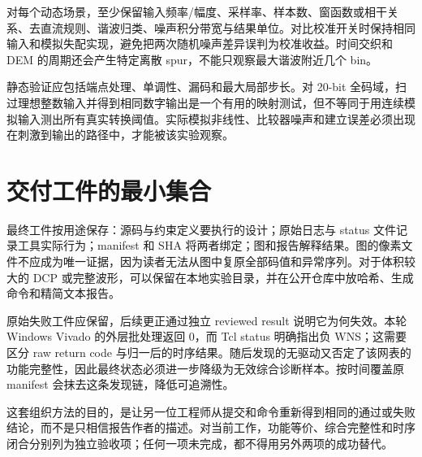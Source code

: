 对每个动态场景，至少保留输入频率/幅度、采样率、样本数、窗函数或相干关系、去直流规则、谐波归类、噪声积分带宽与结果单位。对比校准开关时保持相同输入和模拟失配实现，避免把两次随机噪声差异误判为校准收益。时间交织和 DEM 的周期还会产生特定离散 spur，不能只观察最大谐波附近几个 bin。

静态验证应包括端点处理、单调性、漏码和最大局部步长。对 20-bit 全码域，扫过理想整数输入并得到相同数字输出是一个有用的映射测试，但不等同于用连续模拟输入测出所有真实转换阈值。实际模拟非线性、比较器噪声和建立误差必须出现在刺激到输出的路径中，才能被该实验观察。

\section{交付工件的最小集合}
最终工件按用途保存：源码与约束定义要执行的设计；原始日志与 status 文件记录工具实际行为；manifest 和 SHA 将两者绑定；图和报告解释结果。图的像素文件不应成为唯一证据，因为读者无法从图中复原全部码值和异常序列。对于体积较大的 DCP 或完整波形，可以保留在本地实验目录，并在公开仓库中放哈希、生成命令和精简文本报告。

原始失败工件应保留，后续更正通过独立 reviewed result 说明它为何失效。本轮 Windows Vivado 的外层批处理返回 0，而 Tcl status 明确指出负 WNS；这需要区分 raw return code 与归一后的时序结果。随后发现的无驱动又否定了该网表的功能完整性，因此最终状态必须进一步降级为无效综合诊断样本。按时间覆盖原 manifest 会抹去这条发现链，降低可追溯性。

这套组织方法的目的，是让另一位工程师从提交和命令重新得到相同的通过或失败结论，而不是只相信报告作者的描述。对当前工作，功能等价、综合完整性和时序闭合分别列为独立验收项；任何一项未完成，都不得用另外两项的成功替代。
